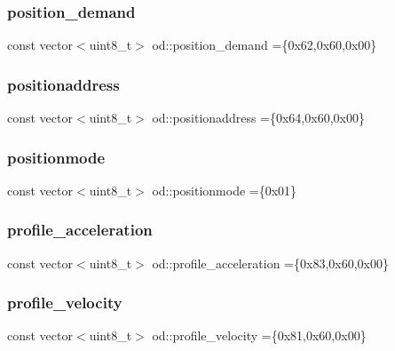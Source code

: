 \subsubsection{\texorpdfstring{position\+\_\+demand}{position\_demand}}
{\footnotesize\ttfamily const vector$<$uint8\+\_\+t$>$ od\+::position\+\_\+demand =\{0x62,0x60,0x00\}}

\mbox{\label{namespaceod_a716df35f1a3cc3e1792c033be7fc0518}} 
\subsubsection{\texorpdfstring{positionaddress}{positionaddress}}
{\footnotesize\ttfamily const vector$<$uint8\+\_\+t$>$ od\+::positionaddress =\{0x64,0x60,0x00\}}

\mbox{\label{namespaceod_a85efca0656a6714d7227858e112c4a73}} 
\subsubsection{\texorpdfstring{positionmode}{positionmode}}
{\footnotesize\ttfamily const vector$<$uint8\+\_\+t$>$ od\+::positionmode =\{0x01\}}

\mbox{\label{namespaceod_aced8c17d62c0e774949057de0a99f402}} 
\subsubsection{\texorpdfstring{profile\+\_\+acceleration}{profile\_acceleration}}
{\footnotesize\ttfamily const vector$<$uint8\+\_\+t$>$ od\+::profile\+\_\+acceleration =\{0x83,0x60,0x00\}}

\mbox{\label{namespaceod_a47b7c8f6797cc134be5ee1d78d83ee50}} 
\subsubsection{\texorpdfstring{profile\+\_\+velocity}{profile\_velocity}}
{\footnotesize\ttfamily const vector$<$uint8\+\_\+t$>$ od\+::profile\+\_\+velocity =\{0x81,0x60,0x00\}}

